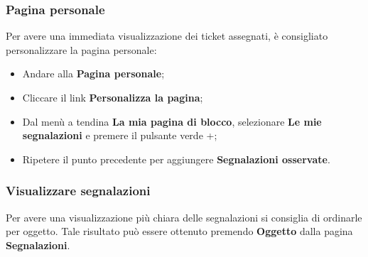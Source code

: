 \subsubsection{Pagina personale}
 
	Per avere una immediata visualizzazione dei ticket assegnati, \`{e} consigliato personalizzare 
	la pagina personale: 
	\begin{itemize}
		\item Andare alla \textbf{Pagina personale}; 
		\item Cliccare il link \textbf{Personalizza la pagina}; 
		\item Dal men\`{u} a tendina \textbf{La mia pagina di blocco}, selezionare \textbf{Le mie segnalazioni} 
		e premere il pulsante verde +; 
		\item Ripetere il punto precedente per aggiungere \textbf{Segnalazioni osservate}. 
	
	\end{itemize}

	
\subsubsection{Visualizzare segnalazioni}

	Per avere una visualizzazione pi\`{u} chiara delle segnalazioni si consiglia di ordinarle per 
	oggetto. Tale risultato pu\`{o} essere ottenuto premendo \textbf{Oggetto} dalla pagina \textbf{Segnalazioni}.


